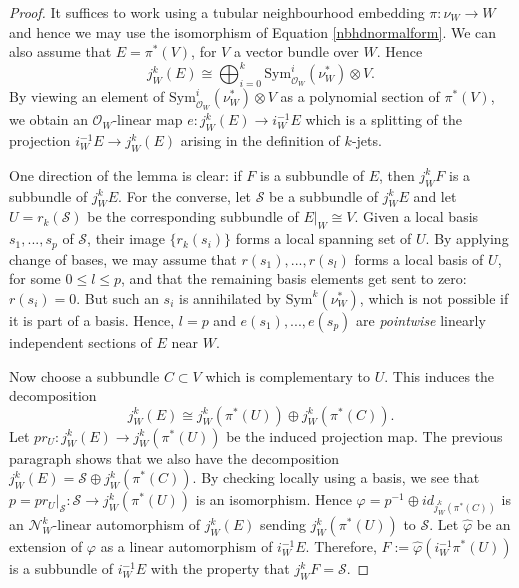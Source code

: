 \documentclass[10pt]{amsart}
\renewcommand{\hat}{\widehat}
\numberwithin{theoremalpha}{section}
\numberwithin{equation}{section}
\numberwithin{definition}{section}
\numberwithin{theorem}{section}
\numberwithin{proposition}{section}
\numberwithin{lemma}{section}
\numberwithin{example}{section}
\numberwithin{remark}{section}
\numberwithin{corollary}{section}
\numberwithin{question}{section}
\numberwithin{problem}{section}
\numberwithin{assumption}{section}
\theoremstyle{named}
\numberwithin{equation}{section}
\begin{document}
\begin{proof}
It suffices to work using a tubular neighbourhood embedding $\pi: \nu_{W} \to W$ and hence we may use the isomorphism of Equation \ref{nbhdnormalform}. We can also assume that $E = \pi^*(V)$, for $V$ a vector bundle over $W$. Hence 
\[
j^{k}_{W}(E) \cong \bigoplus_{i = 0}^{k} \mathrm{Sym}_{\mathcal{O}_{W}}^{i}(\nu_{W}^{*}) \otimes V. 
\]
By viewing an element of $\mathrm{Sym}_{\mathcal{O}_{W}}^{i}(\nu_{W}^{*}) \otimes V$ as a polynomial section of $\pi^*(V)$, we obtain an $\mathcal{O}_{W}$-linear map $e: j^{k}_{W}(E) \to i_{W}^{-1}E$ which is a splitting of the projection $i_{W}^{-1}E \to j^{k}_{W}(E)$ arising in the definition of $k$-jets.

One direction of the lemma is clear: if $F$ is a subbundle of $E$, then $j^{k}_{W}F$ is a subbundle of $j^{k}_{W}E$. For the converse, let $\mathcal{S}$ be a subbundle of $j^{k}_{W}E$ and let $U = r_{k}(\mathcal{S}) $ be the corresponding subbundle of $E|_{W} \cong V$. Given a local basis $s_{1}, ..., s_{p}$ of $\mathcal{S}$, their image $\{ r_{k}(s_{i}) \}$ forms a local spanning set of $U$. By applying change of bases, we may assume that $r(s_{1}), ..., r(s_{l})$  forms a local basis of $U$, for some $0 \leq l \leq p$, and that the remaining basis elements get sent to zero: $r(s_{i}) = 0$. But such an $s_{i}$ is annihilated by $\mathrm{Sym}^{k}(\nu_{W}^*)$, which is not possible if it is part of a basis. Hence, $l = p$ and $e(s_{1}), ..., e(s_{p})$ are \emph{pointwise} linearly independent sections of $E$ near $W$. 

Now choose a subbundle $C \subset V$ which is complementary to $U$. This induces the decomposition 
\[
j^{k}_{W}(E) \cong j^{k}_{W}(\pi^*(U)) \oplus j^{k}_{W}(\pi^*(C)). 
\]
Let $pr_{U} : j^{k}_{W}(E) \to  j^{k}_{W}(\pi^*(U))$ be the induced projection map. The previous paragraph shows that we also have the decomposition $j_{W}^{k}(E) = \mathcal{S} \oplus j^{k}_{W}(\pi^*(C))$. By checking locally using a basis, we see that $p = pr_{U}|_{\mathcal{S}} : \mathcal{S} \to j^{k}_{W}(\pi^*(U))$ is an isomorphism. Hence $\varphi = p^{-1} \oplus id_{ j^{k}_{W}(\pi^*(C))}$ is an $\mathcal{N}_{W}^{k}$-linear automorphism of $j^{k}_{W}(E) $ sending $ j^{k}_{W}(\pi^*(U)) $ to $\mathcal{S}$. Let $\hat{\varphi}$ be an extension of $\varphi$ as a linear automorphism of $i_{W}^{-1}E$. Therefore, $F := \hat{\varphi}(i_{W}^{-1} \pi^*(U))$ is a subbundle of $i_{W}^{-1}E$ with the property that $j^{k}_{W}F = \mathcal{S}$. 
\end{proof}
\end{document}
